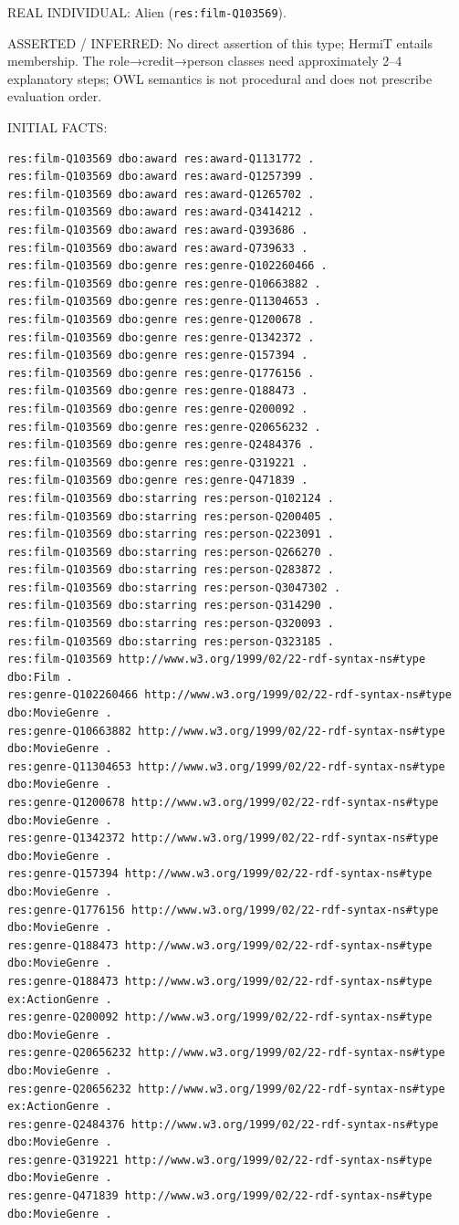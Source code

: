 \documentclass[
  11pt,
]{article}
\begin{document}
REAL INDIVIDUAL: Alien
(\texttt{res:\allowbreak{}film\allowbreak{}-\allowbreak{}\allowbreak{}Q103569\allowbreak{}}).

ASSERTED / INFERRED: No direct assertion of this type; HermiT entails
membership. The role→credit→person classes need
approxim\allowbreak{}ately 2--4 explanatory steps; OWL semantics is not
procedural and does not prescribe evaluation order.

INITIAL FACTS:

\begin{verbatim}
res:film-Q103569 dbo:award res:award-Q1131772 .
res:film-Q103569 dbo:award res:award-Q1257399 .
res:film-Q103569 dbo:award res:award-Q1265702 .
res:film-Q103569 dbo:award res:award-Q3414212 .
res:film-Q103569 dbo:award res:award-Q393686 .
res:film-Q103569 dbo:award res:award-Q739633 .
res:film-Q103569 dbo:genre res:genre-Q102260466 .
res:film-Q103569 dbo:genre res:genre-Q10663882 .
res:film-Q103569 dbo:genre res:genre-Q11304653 .
res:film-Q103569 dbo:genre res:genre-Q1200678 .
res:film-Q103569 dbo:genre res:genre-Q1342372 .
res:film-Q103569 dbo:genre res:genre-Q157394 .
res:film-Q103569 dbo:genre res:genre-Q1776156 .
res:film-Q103569 dbo:genre res:genre-Q188473 .
res:film-Q103569 dbo:genre res:genre-Q200092 .
res:film-Q103569 dbo:genre res:genre-Q20656232 .
res:film-Q103569 dbo:genre res:genre-Q2484376 .
res:film-Q103569 dbo:genre res:genre-Q319221 .
res:film-Q103569 dbo:genre res:genre-Q471839 .
res:film-Q103569 dbo:starring res:person-Q102124 .
res:film-Q103569 dbo:starring res:person-Q200405 .
res:film-Q103569 dbo:starring res:person-Q223091 .
res:film-Q103569 dbo:starring res:person-Q266270 .
res:film-Q103569 dbo:starring res:person-Q283872 .
res:film-Q103569 dbo:starring res:person-Q3047302 .
res:film-Q103569 dbo:starring res:person-Q314290 .
res:film-Q103569 dbo:starring res:person-Q320093 .
res:film-Q103569 dbo:starring res:person-Q323185 .
res:film-Q103569 http://www.w3.org/1999/02/22-rdf-syntax-ns#type dbo:Film .
res:genre-Q102260466 http://www.w3.org/1999/02/22-rdf-syntax-ns#type dbo:MovieGenre .
res:genre-Q10663882 http://www.w3.org/1999/02/22-rdf-syntax-ns#type dbo:MovieGenre .
res:genre-Q11304653 http://www.w3.org/1999/02/22-rdf-syntax-ns#type dbo:MovieGenre .
res:genre-Q1200678 http://www.w3.org/1999/02/22-rdf-syntax-ns#type dbo:MovieGenre .
res:genre-Q1342372 http://www.w3.org/1999/02/22-rdf-syntax-ns#type dbo:MovieGenre .
res:genre-Q157394 http://www.w3.org/1999/02/22-rdf-syntax-ns#type dbo:MovieGenre .
res:genre-Q1776156 http://www.w3.org/1999/02/22-rdf-syntax-ns#type dbo:MovieGenre .
res:genre-Q188473 http://www.w3.org/1999/02/22-rdf-syntax-ns#type dbo:MovieGenre .
res:genre-Q188473 http://www.w3.org/1999/02/22-rdf-syntax-ns#type ex:ActionGenre .
res:genre-Q200092 http://www.w3.org/1999/02/22-rdf-syntax-ns#type dbo:MovieGenre .
res:genre-Q20656232 http://www.w3.org/1999/02/22-rdf-syntax-ns#type dbo:MovieGenre .
res:genre-Q20656232 http://www.w3.org/1999/02/22-rdf-syntax-ns#type ex:ActionGenre .
res:genre-Q2484376 http://www.w3.org/1999/02/22-rdf-syntax-ns#type dbo:MovieGenre .
res:genre-Q319221 http://www.w3.org/1999/02/22-rdf-syntax-ns#type dbo:MovieGenre .
res:genre-Q471839 http://www.w3.org/1999/02/22-rdf-syntax-ns#type dbo:MovieGenre .
\end{verbatim}
\end{document}
